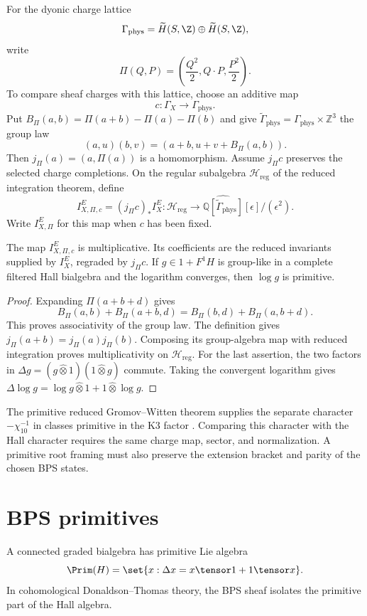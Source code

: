For the dyonic charge lattice
\[
 \Gamma_{\mathrm{phys}}
 =\widetilde H(S,\Z)\oplus\widetilde H(S,\Z),
\]
write
\[
 \Pi(Q,P)=\left(\frac{Q^2}{2},Q\cdot P,\frac{P^2}{2}\right).
\]
To compare sheaf charges with this lattice, choose an additive map
\[
 c:\Gamma_X\longrightarrow\Gamma_{\mathrm{phys}}.
\]
Put $B_\Pi(a,b)=\Pi(a+b)-\Pi(a)-\Pi(b)$ and give
$\widetilde\Gamma_{\mathrm{phys}}=\Gamma_{\mathrm{phys}}\times\mathbb Z^3$
the group law
\[
 (a,u)(b,v)=(a+b,u+v+B_\Pi(a,b)).
\]
Then $j_\Pi(a)=(a,\Pi(a))$ is a homomorphism.
Assume $j_\Pi c$ preserves the selected charge completions.
On the regular subalgebra $\mathcal H_{\mathrm{reg}}$ of the reduced
integration theorem, define
\[
 I_{X,\Pi,c}^E=(j_\Pi c)_*I_X^E:
 \mathcal H_{\mathrm{reg}}\longrightarrow
 \widehat{\mathbb Q[\widetilde\Gamma_{\mathrm{phys}}]}
 [\epsilon]/(\epsilon^2).
\]
Write $I_{X,\Pi}^E$ for this map when $c$ has been fixed.

\begin{proposition}\label{cyiv:polarized-character}
The map $I_{X,\Pi,c}^E$ is multiplicative.
Its coefficients are the reduced invariants supplied by $I_X^E$,
regraded by $j_\Pi c$.
If $g\in1+F^1H$ is group-like in a complete filtered Hall bialgebra
and the logarithm converges, then $\log g$ is primitive.
\end{proposition}
\begin{proof}
Expanding $\Pi(a+b+d)$ gives
\[
 B_\Pi(a,b)+B_\Pi(a+b,d)=B_\Pi(b,d)+B_\Pi(a,b+d).
\]
This proves associativity of the group law.
The definition gives $j_\Pi(a+b)=j_\Pi(a)j_\Pi(b)$.
Composing its group-algebra map with reduced integration proves
multiplicativity on $\mathcal H_{\mathrm{reg}}$.
For the last assertion, the two factors in
$\Delta g=(g\widehat\otimes1)(1\widehat\otimes g)$ commute.
Taking the convergent logarithm gives
$\Delta\log g=\log g\widehat\otimes1+1\widehat\otimes\log g$.
\end{proof}

The primitive reduced Gromov--Witten theorem supplies the separate
character $-\chi_{10}^{-1}$ in classes primitive in the K3 factor
\cite{OP}.
Comparing this character with the Hall character requires the same
charge map, sector, and normalization.
A primitive root framing must also preserve the extension bracket
and parity of the chosen BPS states.

\chapter{BPS primitives}
A connected graded bialgebra has primitive Lie algebra
\[
 \Prim(H)=\set{x:\Delta x=x\tensor1+1\tensor x}.
\]
In cohomological Donaldson--Thomas theory, the BPS sheaf isolates the primitive part of the Hall algebra.

